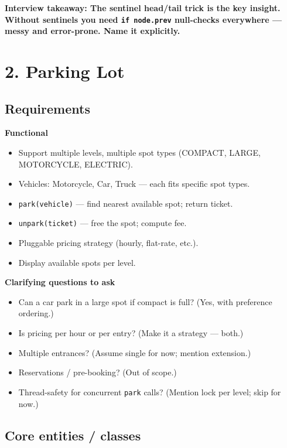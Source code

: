\documentclass[11pt]{article}
\providecommand{\tightlist}{\setlength{\itemsep}{1pt}\setlength{\parskip}{0pt}}
\begin{document}
\textbf{Interview takeaway: The sentinel head/tail trick is the key insight. Without sentinels you need \texttt{if\ node.prev} null-checks everywhere --- messy and error-prone. Name it explicitly.}

\section{2. Parking Lot}\label{2-parking-lot}

\subsection{Requirements}\label{requirements-1}

\textbf{Functional}

\begin{itemize}
\tightlist
\item
  Support multiple levels, multiple spot types (COMPACT, LARGE, MOTORCYCLE, ELECTRIC).
\item
  Vehicles: Motorcycle, Car, Truck --- each fits specific spot types.
\item
  \texttt{park(vehicle)} --- find nearest available spot; return ticket.
\item
  \texttt{unpark(ticket)} --- free the spot; compute fee.
\item
  Pluggable pricing strategy (hourly, flat-rate, etc.).
\item
  Display available spots per level.
\end{itemize}

\textbf{Clarifying questions to ask}

\begin{itemize}
\tightlist
\item
  Can a car park in a large spot if compact is full? (Yes, with preference ordering.)
\item
  Is pricing per hour or per entry? (Make it a strategy --- both.)
\item
  Multiple entrances? (Assume single for now; mention extension.)
\item
  Reservations / pre-booking? (Out of scope.)
\item
  Thread-safety for concurrent \texttt{park} calls? (Mention lock per level; skip for now.)
\end{itemize}

\subsection{Core entities / classes}\label{core-entities--classes-1}
\end{document}
